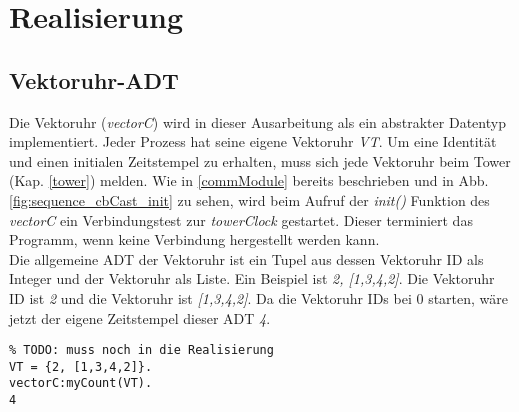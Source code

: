\section{Realisierung}


\subsection{Vektoruhr-ADT}

Die Vektoruhr (\textit{vectorC}) wird in dieser Ausarbeitung als ein abstrakter Datentyp implementiert. Jeder Prozess hat seine eigene Vektoruhr \textit{VT}. Um eine Identität und einen initialen Zeitstempel zu erhalten, muss sich jede Vektoruhr beim Tower (Kap. \ref{tower}) melden.
Wie in \ref{commModule} bereits beschrieben und in Abb. \ref{fig:sequence_cbCast_init} zu sehen, wird beim Aufruf der \textit{init()} Funktion des \textit{vectorC} ein Verbindungstest zur \textit{towerClock} gestartet. Dieser terminiert das Programm, wenn keine Verbindung hergestellt werden kann.
\\Die allgemeine ADT der Vektoruhr ist ein Tupel aus dessen Vektoruhr ID als Integer und der Vektoruhr als Liste. Ein Beispiel ist \textit{{2, [1,3,4,2]}}. Die Vektoruhr ID ist \textit{2} und die Vektoruhr ist \textit{[1,3,4,2]}. Da die Vektoruhr IDs bei 0 starten, wäre jetzt der eigene Zeitstempel dieser ADT \textit{4}.

\begin{lstlisting}
% TODO: muss noch in die Realisierung
VT = {2, [1,3,4,2]}.
vectorC:myCount(VT).
4
\end{lstlisting}